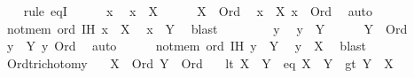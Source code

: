 \begin{isabellebody}
\ \ \isamarkupfalse%
\ {\isacharparenleft}{\kern0pt}rule\ eqI{\isacharparenright}{\kern0pt}\isanewline
\ \ \ \ \isamarkupfalse%
\ x\ \isamarkupfalse%
\ {\isachardoublequoteopen}x\ {\isasymin}\ X{\isachardoublequoteclose}\isanewline
\ \ \ \ \isamarkupfalse%
\ {\isacartoucheopen}X\ {\isacharcolon}{\kern0pt}\ Ord{\isacartoucheclose}\ \isamarkupfalse%
\ {\isachardoublequoteopen}x\ {\isasymsubseteq}\ X{\isachardoublequoteclose}\ {\isachardoublequoteopen}x\ {\isacharcolon}{\kern0pt}\ Ord{\isachardoublequoteclose}\ \isamarkupfalse%
\ auto\isanewline
\ \ \ \ \isamarkupfalse%
\ not{\isacharunderscore}{\kern0pt}mem\ ord\ IH{}\ {\isacartoucheopen}x\ {\isasymin}\ X{\isacartoucheclose}\ \isamarkupfalse%
\ {\isachardoublequoteopen}x\ {\isasymin}\ Y{\isachardoublequoteclose}\ \isamarkupfalse%
\ blast\isanewline
\ \ \isamarkupfalse%
\isanewline
\ \ \ \ \isamarkupfalse%
\ y\ \isamarkupfalse%
\ {\isachardoublequoteopen}y\ {\isasymin}\ Y{\isachardoublequoteclose}\isanewline
\ \ \ \ \isamarkupfalse%
\ {\isacartoucheopen}Y\ {\isacharcolon}{\kern0pt}\ Ord{\isacartoucheclose}\ \ \isamarkupfalse%
\ {\isachardoublequoteopen}y\ {\isasymsubseteq}\ Y{\isachardoublequoteclose}\ {\isachardoublequoteopen}y{\isacharcolon}{\kern0pt}\ Ord{\isachardoublequoteclose}\ \isamarkupfalse%
\ auto\isanewline
\ \ \ \ \isamarkupfalse%
\ not{\isacharunderscore}{\kern0pt}mem\ ord\ IH{}\ {\isacartoucheopen}y\ {\isasymin}\ Y{\isacartoucheclose}\ \isamarkupfalse%
\ {\isachardoublequoteopen}y\ {\isasymin}\ X{\isachardoublequoteclose}\ \isamarkupfalse%
\ blast\isanewline
\ \ \isamarkupfalse%
\isanewline
{}\isamarkupfalse%
%
\endisatagproof
{\isafoldproof}%
%
\isadelimproof
\isanewline
%
\endisadelimproof
\isanewline
{}\isamarkupfalse%
\ Ord{\isacharunderscore}{\kern0pt}trichotomy{\isacharcolon}{\kern0pt}\isanewline
\ \ \ {\isachardoublequoteopen}X\ {\isacharcolon}{\kern0pt}\ Ord{\isachardoublequoteclose}\ {\isachardoublequoteopen}Y\ {\isacharcolon}{\kern0pt}\ Ord{\isachardoublequoteclose}\isanewline
\ \ \ {\isacharparenleft}{\kern0pt}lt{\isacharparenright}{\kern0pt}\ {\isachardoublequoteopen}X\ {\isasymin}\ Y{\isachardoublequoteclose}\ {\isacharbar}{\kern0pt}\ {\isacharparenleft}{\kern0pt}eq{\isacharparenright}{\kern0pt}\ {\isachardoublequoteopen}X\ {\isacharequal}{\kern0pt}\ Y{\isachardoublequoteclose}\ {\isacharbar}{\kern0pt}\ {\isacharparenleft}{\kern0pt}gt{\isacharparenright}{\kern0pt}\ {\isachardoublequoteopen}Y\ {\isasymin}\ X{\isachardoublequoteclose}\isanewline

\end{isabellebody}
